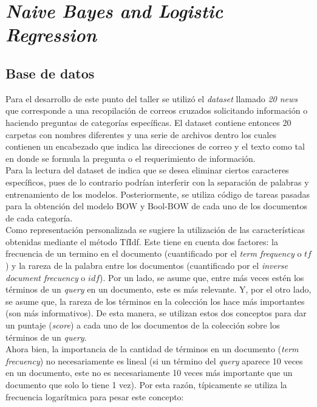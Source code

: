 \section{\textit{Naive Bayes and Logistic Regression}}

\subsection{Base de datos}
Para el desarrollo de este punto del taller se utilizó el \textit{dataset} llamado \textit{20 news} que corresponde a una recopilación de correos cruzados solicitando información o haciendo preguntas de categorías específicas. El dataset contiene entonces 20 carpetas con nombres diferentes y una serie de archivos dentro los cuales contienen un encabezado que indica las direcciones de correo y el texto como tal en donde se formula la pregunta o el requerimiento de información.\\

Para la lectura del dataset de indica que se desea eliminar ciertos caracteres específicos, pues de lo contrario podrían interferir con la separación de palabras y entrenamiento de los modelos. Posteriormente, se utiliza código de tareas pasadas para la obtención del modelo BOW y Bool-BOW de cada uno de los documentos de cada categoría.\\

Como representación personalizada se sugiere la utilización de las características obtenidas mediante el método TfIdf. Este tiene en cuenta dos factores: la frecuencia de un termino en el documento (cuantificado por el \textit{term frequency} o $tf$) y la rareza de la palabra entre los documentos (cuantificado por el \textit{inverse document frecuency} o $idf$). Por un lado, se asume que, entre más veces estén los términos de un \textit{query} en un documento, este es más relevante. Y, por el otro lado, se asume que, la rareza de los términos en la colección los hace más importantes (son más informativos). De esta manera, se utilizan estos dos conceptos para dar un puntaje (\textit{score}) a cada uno de los documentos de la colección sobre los términos de un \textit{query}. \\

Ahora bien, la importancia de la cantidad de términos en un documento (\textit{term frecuency}) no necesariamente es lineal (si un término del \textit{query} aparece 10 veces en un documento, este no es necesariamente 10 veces más importante que un documento que solo lo tiene 1 vez). Por esta razón, típicamente se utiliza la frecuencia logarítmica para pesar este concepto:

